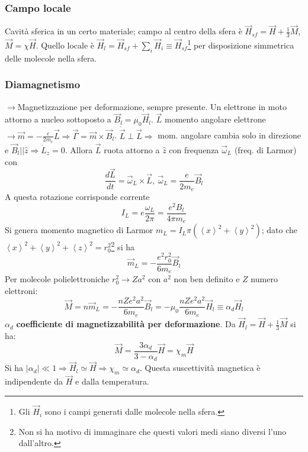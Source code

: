 \documentclass[10pt, a4paper]{scrartcl}
\numberwithin{equation}{subsection}
\theoremstyle{style1}
\begin{document}
\subsubsection{Campo locale}
Cavit\`a sferica in un certo materiale; campo al centro della sfera \`e $\vec{H}_{sf} = \vec{H}+\frac{1}{3}\vec{M}$, $\vec{M}=\chi \vec{H}$. Quello locale \`e $\vec{H}_l = \vec{H}_{sf}  + \sum_{i}^{} \vec{H}_i\equiv \vec{H}_{sf} $\footnote{Gli $\vec{H}_i$ sono i campi generati dalle molecole nella sfera.} per disposizione simmetrica delle molecole nella sfera.
\subsubsection{Diamagnetismo}

$\to$Magnetizzazione per deformazione, sempre presente. Un elettrone in moto attorno a nucleo sottoposto a $\vec{B}_l = \mu_0 \vec{H}_l$. $\vec{L}$ momento angolare elettrone $\to \vec{m} = - \frac{e}{2m_e}\vec{L}\Rightarrow \vec{\Gamma} = \vec{m} \times \vec{B}_l$. $\dot{\vec{L}} \perp \vec{L}\Rightarrow $ mom. angolare cambia solo in direzione e $\vec{B}_l | | \hat{z}\Rightarrow \dot{L}_z = 0$. Allora $\vec{L}$ ruota attorno a $\hat{z}$ con frequenza $\vec{\omega}_L$ (freq. di Larmor) con
\begin{equation*}
	\frac{d \vec{L}}{d t}  = \vec{\omega}_L \times \vec{L}, \ \vec{\omega}_L =  \frac{e}{2m_e}\vec{B}_l
\end{equation*}
A questa rotazione corrisponde corrente
\[
I_L = e \frac{\omega_L}{2\pi} = \frac{e^2 B_l}{4 \pi m_e}
\] 
Si genera momento magnetico di Larmor $m_L = I_L \pi(\left\langle x \right\rangle^2 + \left\langle y \right\rangle^2)$; dato che $\left\langle x \right\rangle^2 + \left\langle y \right\rangle^2 + \left\langle z \right\rangle^2 = r_0^2$\footnote{Non si ha motivo di immaginare che questi valori medi siano diversi l'uno dall'altro.} si ha
\[
\vec{m}_L = - \frac{e^2 r_0^2}{6m_e}\vec{B}_l
\] 
Per molecole polielettroniche $r_0^2 \to Z a^2$ con $a^2$ non ben definito e $Z$ numero elettroni:
\begin{equation}
	\vec{M} = n \vec{m}_L = - \frac{nZe^2 a^2}{6m_e} \vec{B}_l = - \mu_0 \frac{nZe^2 a^2}{6m_e}\vec{H}_l \equiv \alpha _d \vec{H}_l
\end{equation}
$\alpha _d$ \textbf{coefficiente di magnetizzabilit\`a per deformazione}. Da $\vec{H}_l = \vec{H}+ \frac{1}{3}\vec{M}$ si ha:
\begin{equation}
	\vec{M}= \frac{3\alpha _d}{3 - \alpha _d} \vec{H}=\chi _m \vec{H}
\end{equation}
Si ha $|\alpha _d| \ll 1\Rightarrow \vec{H}_l \simeq \vec{H}\Rightarrow \chi _m \simeq \alpha _d$. Questa suscettivit\`a magnetica \`e indipendente da $\vec{H}$ e dalla temperatura.
\end{document}
